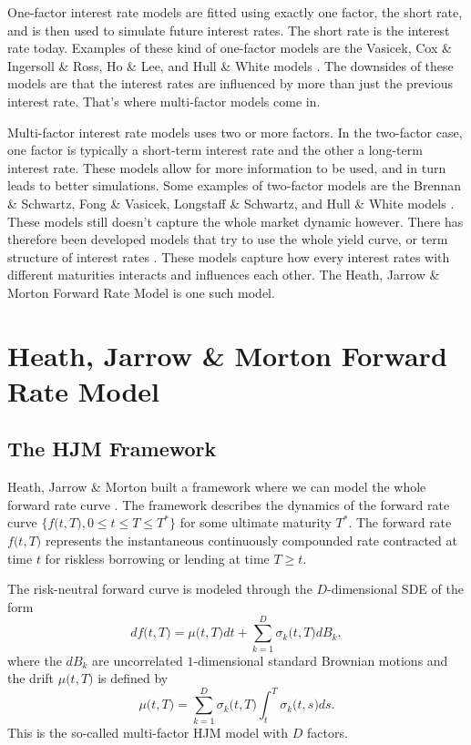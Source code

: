 One-factor interest rate models are fitted using exactly one factor, the short rate, and is then used to simulate future interest rates. The short rate is the interest rate today. Examples of these kind of one-factor models are the Vasicek, Cox \& Ingersoll \& Ross, Ho \& Lee, and Hull \& White models \cite[p.~517]{WFI}. The downsides of these models are that the interest rates \newpage \noindent are influenced by more than just the previous interest rate. That's where multi-factor models come in. \cite[p.~507--624]{WFI}

Multi-factor interest rate models uses two or more factors. In the two-factor case, one factor is typically a short-term interest rate and the other a long-term interest rate. These models allow for more information to be used, and in turn leads to better simulations. Some examples of two-factor models are the Brennan \& Schwartz, Fong \& Vasicek, Longstaff \& Schwartz, and Hull \& White models \cite[p.~584--587]{WFI}. These models still doesn't capture the whole market dynamic however. There has therefore been developed models that try to use the whole yield curve, or term structure of interest rates \cite{investopedia_term_structure}. These models capture how every interest rates with different maturities interacts and influences each other. The Heath, Jarrow \& Morton Forward Rate Model is one such model. \cite[p.~507--624]{WFI}

\section{Heath, Jarrow \& Morton Forward Rate Model} \label{sec: HJM theory}

\subsection{The HJM Framework}

\noindent Heath, Jarrow \& Morton built a framework where we can model the whole forward rate curve \cite[p.~609]{WFI}. The framework describes the dynamics of the forward rate curve $\bigl\{ f \bigl( t, T \bigr), 0 \leq t \leq T \leq T^* \bigr\}$ for some ultimate maturity $T^*$. The forward rate $f \bigl( t, T \bigr)$ represents the instantaneous continuously compounded rate contracted at time $t$ for riskless borrowing or lending at time $T \geq t$. \cite[p.~150]{monte_carlo_method_financial_engineering}

The risk-neutral forward curve is modeled through the $D$-dimensional SDE of the form \begin{equation} \label{eq:hjm model}
    d f \bigl( t, T \bigr) = \mu \bigl( t, T \bigr) dt + \sum_{k=1}^D \sigma_k \bigl( t, T \bigr) dB_k,
\end{equation} where the $dB_k$ are uncorrelated $1$-dimensional standard Brownian motions and the drift $\mu \bigl( t, T \bigr)$ is defined by \begin{equation} \label{eq:hjm drift}
    \mu \bigl( t, T \bigr) = \sum_{k=1}^D \sigma_k \bigl( t, T \bigr) \int_t^T \sigma_k \bigl( t, s \bigr)ds.
\end{equation} This is the so-called multi-factor HJM model with $D$ factors. \cite[p.~615]{WFI}

